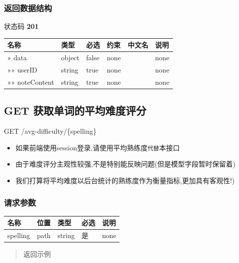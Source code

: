 \documentclass[
]{article}
\begin{document}
\hypertarget{ux8fd4ux56deux6570ux636eux7ed3ux6784-3}{%
\subsubsection{返回数据结构}\label{ux8fd4ux56deux6570ux636eux7ed3ux6784-3}}

状态码 \textbf{201}

\begin{longtable}[]{@{}llllll@{}}
\toprule
名称 & 类型 & 必选 & 约束 & 中文名 & 说明 \\
\midrule
\endhead
» data & object & false & none & & none \\
»» userID & string & true & none & & none \\
»» noteContent & string & true & none & & none \\
\bottomrule
\end{longtable}

\hypertarget{get-ux83b7ux53d6ux5355ux8bcdux7684ux5e73ux5747ux96beux5ea6ux8bc4ux5206}{%
\subsection{GET
获取单词的平均难度评分}\label{get-ux83b7ux53d6ux5355ux8bcdux7684ux5e73ux5747ux96beux5ea6ux8bc4ux5206}}

GET /avg-difficulty/\{spelling\}

\begin{itemize}
\item
  如果前端使用session登录,请使用平均熟练度\texttt{代替}本接口
\item
  由于难度评分主观性较强,不是特别能反映问题(但是模型字段暂时保留着)
\item
  我们打算将平均难度以后台统计的熟练度作为衡量指标,更加具有客观性!)
\end{itemize}

\hypertarget{ux8bf7ux6c42ux53c2ux6570-4}{%
\subsubsection{请求参数}\label{ux8bf7ux6c42ux53c2ux6570-4}}

\begin{longtable}[]{@{}lllll@{}}
\toprule
名称 & 位置 & 类型 & 必选 & 说明 \\
\midrule
\endhead
spelling & path & string & 是 & none \\
\bottomrule
\end{longtable}

\begin{quote}
返回示例
\end{quote}
\end{document}
